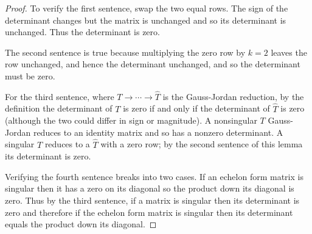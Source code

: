 \begin{proof}
To verify the first sentence, swap the two equal rows.
The sign of the determinant changes but the matrix is unchanged
and so its determinant is unchanged.
Thus the determinant is zero.

The second sentence is true because multiplying 
the zero row by $k=2$ leaves the row unchanged, and hence 
the determinant unchanged, and so the determinant must be zero.

For the third sentence, 
where $T \rightarrow\cdots\rightarrow\hat{T}$ is the
Gauss-Jordan reduction, by the definition
the determinant of $T$ is zero if and only if
the determinant of $\hat{T}$ is zero
(although the two could differ in sign or magnitude).
A nonsingular $T$ Gauss-Jordan reduces to an identity matrix
and so has a nonzero determinant.
A singular $T$ reduces to a $\hat{T}$ with a zero row;
by the second sentence of this lemma its determinant is zero.

Verifying the fourth sentence breaks into two cases.
If an echelon form matrix is singular then
it has a zero on its diagonal so
the product down its diagonal is zero.
Thus by the third sentence, if a matrix is singular 
then its determinant is zero and
therefore if the echelon form matrix is singular then 
its determinant equals the
product down its diagonal.


\end{proof}
